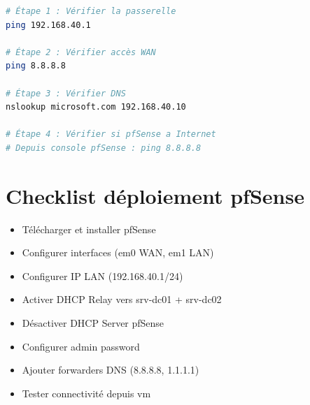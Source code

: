\begin{lstlisting}[language=bash]
# Étape 1 : Vérifier la passerelle
ping 192.168.40.1

# Étape 2 : Vérifier accès WAN
ping 8.8.8.8

# Étape 3 : Vérifier DNS
nslookup microsoft.com 192.168.40.10

# Étape 4 : Vérifier si pfSense a Internet
# Depuis console pfSense : ping 8.8.8.8
\end{lstlisting}

\section{Checklist déploiement pfSense}

\begin{itemize}
    \item[\checkmark] Télécharger et installer pfSense
    \item[\checkmark] Configurer interfaces (em0 WAN, em1 LAN)
    \item[\checkmark] Configurer IP LAN (192.168.40.1/24)
    \item[\checkmark] Activer DHCP Relay vers srv-dc01 + srv-dc02
    \item[\checkmark] Désactiver DHCP Server pfSense
    \item[\checkmark] Configurer admin password
    \item[\checkmark] Ajouter forwarders DNS (8.8.8.8, 1.1.1.1)
    \item[\checkmark] Tester connectivité depuis vm
\end{itemize}
